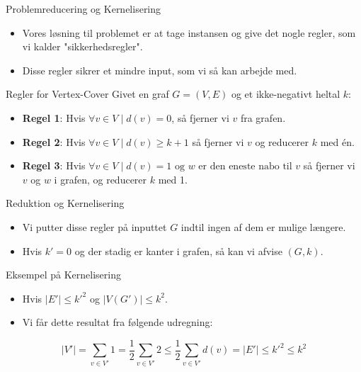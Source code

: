 \begin{frame}{Problemreducering og Kernelisering}
    \begin{itemize}
        \item Vores løsning til problemet er at tage instansen og give det nogle regler, som vi kalder "sikkerhedsregler".
        \item Disse regler sikrer et mindre input, som vi så kan arbejde med.
    \end{itemize}
\end{frame}

\begin{frame}{Regler for Vertex-Cover}
    Givet en graf $G = (V,E)$ og et ikke-negativt heltal $k$:
    \begin{itemize}
        \item \textbf{Regel 1}: Hvis $\forall v \in V \mid d(v) = 0$, så fjerner vi $v$ fra grafen.
        \item \textbf{Regel 2}: Hvis $\forall v \in V \mid d(v) \ge k + 1$ så fjerner vi $v$ og reducerer $k$ med én.
        \item \textbf{Regel 3}: Hvis $\forall v \in V \mid d(v) = 1 \text{ og } w \text{ er den eneste nabo til }v$ så fjerner vi $v$ og $w$ i grafen, og reducerer $k$ med 1.
    \end{itemize}
\end{frame}

\begin{frame}{Reduktion og Kernelisering}
    \begin{itemize}
        \item Vi putter disse regler på inputtet $G$ indtil ingen af dem er mulige længere.
        \item Hvis $k' = 0$ og der stadig er kanter i grafen, så kan vi afvise $(G, k)$.
    \end{itemize}
\end{frame}

\begin{frame}{Eksempel på Kernelisering}
    \begin{itemize}
        \item Hvis $|E'| \le k'^{2}$ og $|V(G')| \le k^{2}$.
        \item Vi får dette resultat fra følgende udregning:
    \end{itemize}
    \begin{equation*}
        |V'| = \sum_{v \in V'} 1 = \frac{1}{2} \sum_{v \in V'} 2 \le \frac{1}{2} \sum_{v \in V'} d(v) = |E'| \le k'^{2} \le k^{2}
    \end{equation*}
\end{frame}

